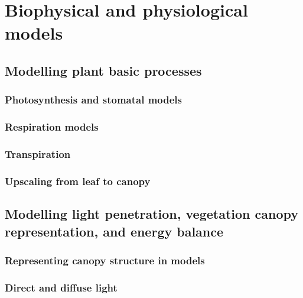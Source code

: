 \documentclass[oneside]{book}
\begin{document}
\part{Biophysical and physiological
models}\label{part-biophysical-and-physiological-models}

\chapter{Modelling plant basic
processes}\label{modelling-plant-basic-processes}


\section{Photosynthesis and stomatal
models}\label{photosynthesis-and-stomatal-models}

\section{Respiration models}\label{respiration-models}

\section{Transpiration}\label{transpiration}

\section{Upscaling from leaf to
canopy}\label{upscaling-from-leaf-to-canopy}

\chapter{Modelling light penetration, vegetation canopy representation,
and energy
balance}\label{modelling-light-penetration-vegetation-canopy-representation-and-energy-balance}


\section{Representing canopy structure in
models}\label{representing-canopy-structure-in-models}

\section{Direct and diffuse light}\label{direct-and-diffuse-light}
\end{document}
